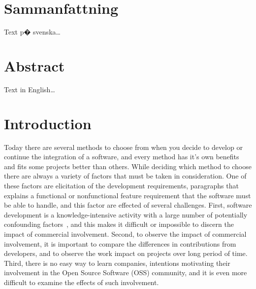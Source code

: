 \documentclass[a4paper,11pt]{article}
\begin{document}
{\newpage

\mbox{}

\newpage

\section*{Sammanfattning}

Text p� svenska\ldots

\newpage

\mbox{}

\newpage

\section*{Abstract}

Text in English\ldots

\newpage

\mbox{}

\newpage
\tableofcontents
\newpage
\ifodd\value{page}\else\mbox{}\newpage\fi
\setcounter{page}{1}
\renewcommand{\thepage}{\rempage}

\section{Introduction}
Today there are several methods to choose from when you decide to develop or continue the integration of a software, and every method has it's own benefits and fits some projects better than others. While deciding which method to choose there are always a variety of factors that must be taken in consideration. One of these factors are elicitation of the development requirements, paragraphs that explains a functional or nonfunctional feature requirement that the software must be able to handle, and this factor are effected of several challenges. First, software development is a knowledge-intensive activity with a large number of potentially confounding factors~\cite{Curtis1986}, and this makes it difficult or impossible to discern the impact of commercial involvement. Second, to observe the impact of commercial involvement, it is important to compare the differences in contributions from developers, and to observe the work impact on projects over long period of time. Third, there is no easy way to learn companies, intentions motivating their involvement in the Open Source Software (OSS) community, and it is even more difficult to examine the effects of such involvement.

}
\end{document}
